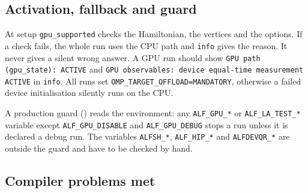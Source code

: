 \subsection{Activation, fallback and guard}

At setup \texttt{gpu\_supported} checks the Hamiltonian, the vertices and the options. If a check fails, the whole run uses the CPU path and \texttt{info} gives the reason. It never gives a silent wrong answer. A GPU run should show \texttt{GPU path (gpu\_state): ACTIVE} and \texttt{GPU observables: device equal-time measurement ACTIVE} in \texttt{info}. All runs set \texttt{OMP\_TARGET\_OFFLOAD=MANDATORY}, otherwise a failed device initialisation silently runs on the CPU.

A production guard () reads the environment: any \texttt{ALF\_GPU\_*} or \texttt{ALF\_LA\_TEST\_*} variable except \texttt{ALF\_GPU\_DISABLE} and \texttt{ALF\_GPU\_DEBUG} stops a run unless it is declared a debug run. The variables \texttt{ALFSH\_*}, \texttt{ALF\_HIP\_*} and \texttt{ALFDEVQR\_*} are outside the guard and have to be checked by hand.

\subsection{Compiler problems met}


